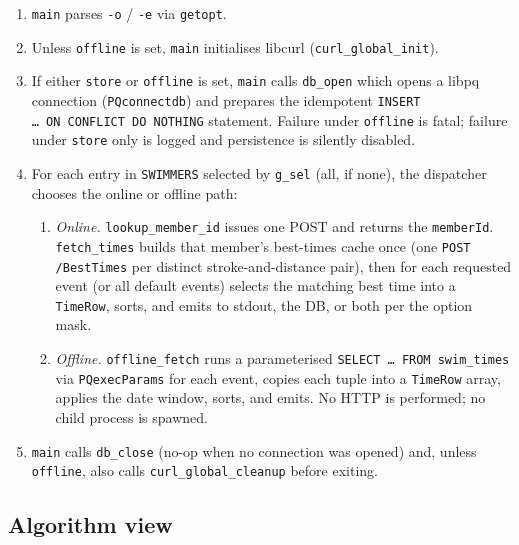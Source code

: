 \documentclass[12pt]{article}
\newcommand{\code}[1]{\texttt{#1}}
\begin{document}
\begin{enumerate}
  \item \code{main} parses \code{-o} / \code{-e} via \code{getopt}.
  \item Unless \code{offline} is set, \code{main} initialises
        libcurl (\code{curl\_global\_init}).
  \item If either \code{store} or \code{offline} is set,
        \code{main} calls \code{db\_open} which opens a libpq
        connection (\code{PQconnectdb}) and prepares the
        idempotent \code{INSERT \dots\ ON~CONFLICT~DO~NOTHING}
        statement.  Failure under \code{offline} is fatal;
        failure under \code{store} only is logged and persistence
        is silently disabled.
  \item For each entry in \code{SWIMMERS} selected by
        \code{g\_sel} (all, if none), the dispatcher chooses the
        online or offline path:
        \begin{enumerate}
          \item \emph{Online.} \code{lookup\_member\_id} issues
                one POST and returns the \code{memberId}.
                \code{fetch\_times} builds that member's best-times
                cache once (one \code{POST /BestTimes} per distinct
                stroke-and-distance pair), then for each requested
                event (or all default events) selects the matching
                best time into a \code{TimeRow}, sorts, and emits to
                stdout, the DB, or both per the option mask.
          \item \emph{Offline.} \code{offline\_fetch} runs a
                parameterised \texttt{SELECT \dots\ FROM swim\_times}
                via \code{PQexecParams} for each event, copies
                each tuple into a \code{TimeRow} array, applies
                the date window, sorts, and emits.  No HTTP is
                performed; no child process is spawned.
        \end{enumerate}
  \item \code{main} calls \code{db\_close} (no-op when no
        connection was opened) and, unless \code{offline}, also
        calls \code{curl\_global\_cleanup} before exiting.
\end{enumerate}

\subsection{Algorithm view}
\end{document}
